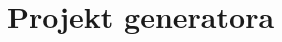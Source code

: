 \documentclass[PZM.tex]{subfiles}
\begin{document}
\section{Projekt generatora}
	\label{ProjektGeneratora}
	
\end{document}
